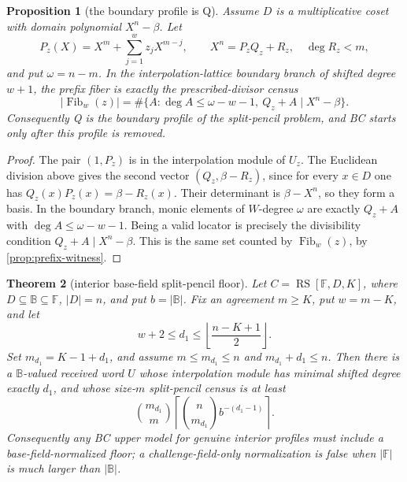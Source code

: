 \documentclass[a4paper,11pt]{amsart}
\newtheorem{theorem}{Theorem}[section]
\newtheorem{proposition}[theorem]{Proposition}
\theoremstyle{remark}
\newcommand{\F}{\mathbb F}
\newcommand{\B}{\mathbb B}
\newcommand{\RS}{\operatorname{RS}}
\newcommand{\Fib}{\operatorname{Fib}}
\begin{document}
\begin{proposition}[the boundary profile is Q]\label{prop:boundary-q}
Assume \(D\) is a multiplicative coset with domain polynomial \(X^n-\beta\).  Let
\[
        P_z(X)=X^m+\sum_{j=1}^w z_jX^{m-j},\qquad
        X^n=P_zQ_z+R_z,\quad \deg R_z<m,
\]
and put \(\omega=n-m\).  In the interpolation-lattice boundary branch of shifted degree \(w+1\), the prefix fiber is exactly the prescribed-divisor census
\[
        |\Fib_w(z)|
        =
        \#\{A:\deg A\le\omega-w-1,\ Q_z+A\mid X^n-\beta\}.
\]
Consequently Q is the boundary profile of the split-pencil problem, and BC starts only after this profile is removed.
\end{proposition}

\begin{proof}
The pair \((1,P_z)\) is in the interpolation module of \(U_z\).  The Euclidean division above gives the second vector \((Q_z,\beta-R_z)\), since for every \(x\in D\) one has \(Q_z(x)P_z(x)=\beta-R_z(x)\).  Their determinant is \(\beta-X^n\), so they form a basis.  In the boundary branch, monic elements of \(W\)-degree \(\omega\) are exactly \(Q_z+A\) with \(\deg A\le\omega-w-1\).  Being a valid locator is precisely the divisibility condition \(Q_z+A\mid X^n-\beta\).  This is the same set counted by \(\Fib_w(z)\), by \cref{prop:prefix-witness}.
\end{proof}

\begin{theorem}[interior base-field split-pencil floor]\label{prop:base-field-floor}
Let \(C=\RS[\F,D,K]\), where \(D\subseteq\B\subseteq\F\), \(|D|=n\), and put \(b=|\B|\).  Fix an agreement \(m\ge K\), put \(w=m-K\), and let
\[
        w+2\le d_1\le \left\lfloor \frac{n-K+1}{2}\right\rfloor .
\]
Set \(m_{d_1}=K-1+d_1\), and assume \(m\le m_{d_1}\le n\) and \(m_{d_1}+d_1\le n\).  Then there is a \(\B\)-valued received word \(U\) whose interpolation module has minimal shifted degree exactly \(d_1\), and whose size-\(m\) split-pencil census is at least
\[
        \binom{m_{d_1}}{m}
        \left\lceil\binom{n}{m_{d_1}}b^{-(d_1-1)}\right\rceil .
\]
Consequently any BC upper model for genuine interior profiles must include a base-field-normalized floor; a challenge-field-only normalization is false when \(|\F|\) is much larger than \(|\B|\).
\end{theorem}
\end{document}
